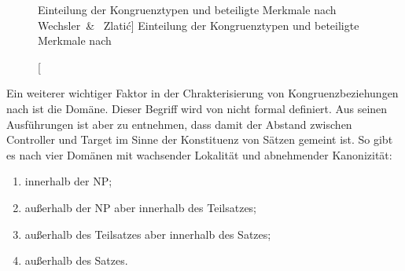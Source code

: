 \begin{figure}
\centering
{}
\caption%
	[Einteilung der Kongruenztypen und beteiligte Merkmale nach Wechsler~\&~%
	Zlatić]%
	{Einteilung der Kongruenztypen und beteiligte Merkmale nach
	\citet{wechslerzlatic2003}}
\label{fig:termini}
\end{figure}

Ein weiterer wichtiger Faktor in der Chrakterisierung von Kongruenzbeziehungen
nach \citet{corbett2006} ist die Domäne. Dieser Begriff wird von
\citet{corbett2006} nicht formal definiert. Aus seinen Ausführungen ist aber zu
entnehmen, dass damit der Abstand zwischen Controller und Target im Sinne der
Konstituenz von Sätzen gemeint ist. So gibt es nach \citet[54]{corbett2006}
vier Domänen mit wachsender Lokalität und abnehmender Kanonizität:

\begin{enumerate}[noitemsep]
	\item innerhalb der NP;
	\item außerhalb der NP aber innerhalb des Teilsatzes;
	\item außerhalb des Teilsatzes aber innerhalb des Satzes;
	\item außerhalb des Satzes.
\end{enumerate}

